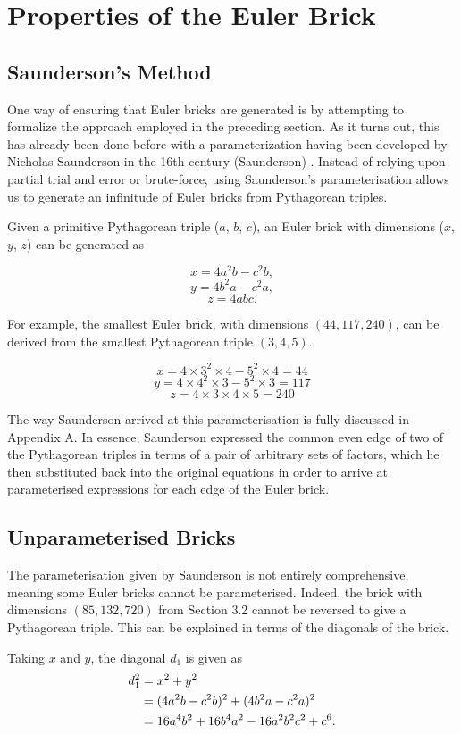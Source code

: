 \documentclass[11pt]{article}
\begin{document}
\section{Properties of the Euler Brick}
\subsection{Saunderson's Method}
One way of ensuring that Euler bricks are generated is by attempting to formalize the approach employed in the preceding section. As it turns out, this has already been done before with a parameterization having been developed by Nicholas Saunderson in the 16th century (Saunderson) \cite[p. 429-431]{saunderson}. Instead of relying upon partial trial and error or brute-force, using Saunderson's parameterisation allows us to generate an infinitude of Euler bricks from Pythagorean triples.

Given a primitive Pythagorean triple ($a$, $b$, $c$), an Euler brick with dimensions ($x$, $y$, $z$) can be generated as

$$x=4a^2b-c^2b,$$
$$y=4b^2a-c^2a,$$
$$z=4abc.$$

For example, the smallest Euler brick, with dimensions $(44, 117, 240)$, can be derived from the smallest Pythagorean triple $(3, 4, 5)$.

$$x=4\times{3^2}\times{4}-5^2\times{4}=44$$
$$y=4\times{4^2}\times{3}-5^2\times{3}=117$$
$$z=4\times{3}\times{4}\times{5}=240$$

The way Saunderson arrived at this parameterisation is fully discussed in Appendix A. In essence, Saunderson expressed the common even edge of two of the Pythagorean triples in terms of a pair of arbitrary sets of factors, which he then substituted back into the original equations in order to arrive at parameterised expressions for each edge of the Euler brick.


\subsection{Unparameterised Bricks}
The parameterisation given by Saunderson is not entirely comprehensive, meaning some Euler bricks cannot be parameterised. Indeed, the brick with dimensions $(85, 132, 720)$ from Section 3.2 cannot be reversed to give a Pythagorean triple. This can be explained in terms of the diagonals of the brick. 

Taking $x$ and $y$, the diagonal $d_1$ is given as
\begin{equation}
\notag
\begin{aligned}
d_1^2&=x^2+y^2\\
&=(4a^2b-c^2b)^2+(4b^2a-c^2a)^2\\
&=16a^4b^2+16b^4a^2-16a^2b^2c^2+c^6.
\end{aligned}
\end{equation}
\end{document}
